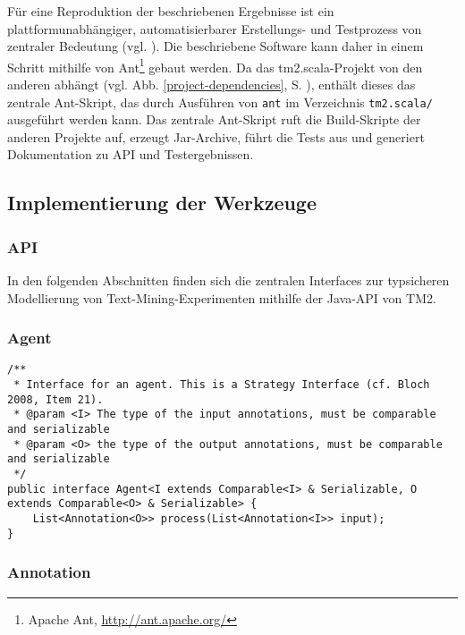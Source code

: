 \documentclass[abstracton, 12pt]{scrartcl}
\begin{document}
Für eine Reproduktion der beschriebenen Ergebnisse ist ein plattformunabhängiger, automatisierbarer Erstellungs- und Testprozess von zentraler Bedeutung (vgl. \citealt{Clark2006}). Die beschriebene Software kann daher in einem Schritt mithilfe von Ant\footnote{Apache Ant, \url{http://ant.apache.org/}} gebaut werden. Da das tm2.scala-Projekt von den anderen abhängt (vgl. Abb. \ref{project-dependencies}, S. \pageref{project-dependencies}), enthält dieses das zentrale Ant-Skript, das durch Ausführen von \lstinline!ant! im Verzeichnis \lstinline!tm2.scala/! ausgeführt werden kann. Das zentrale Ant-Skript ruft die Build-Skripte der anderen Projekte auf, erzeugt Jar-Archive, führt die Tests aus und generiert Dokumentation zu API und Testergebnissen.

\subsection{Implementierung der Werkzeuge} \label{anhang-impl}

\subsubsection{API} \label{anhang-api}   

In den folgenden Abschnitten finden sich die zentralen Interfaces zur typsicheren Modellierung von Text-Mining-Experimenten mithilfe der Java-API von TM2.

\subsubsection{Agent}

\lstset{language=Java}
\begin{lstlisting}
/**
 * Interface for an agent. This is a Strategy Interface (cf. Bloch 2008, Item 21).
 * @param <I> The type of the input annotations, must be comparable and serializable
 * @param <O> the type of the output annotations, must be comparable and serializable
 */
public interface Agent<I extends Comparable<I> & Serializable, O extends Comparable<O> & Serializable> {
    List<Annotation<O>> process(List<Annotation<I>> input);
}
\end{lstlisting}

\subsubsection{Annotation}
\end{document}
